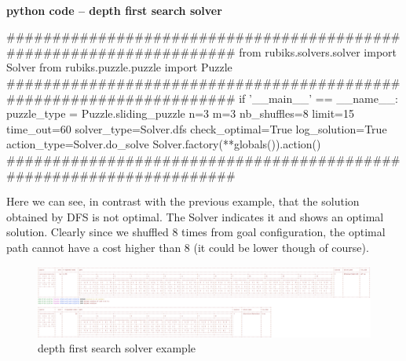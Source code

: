 \paragraph{}{\textbf{python code -- depth first search solver}}
\begin{python}
####################################################################
from rubiks.solvers.solver import Solver
from rubiks.puzzle.puzzle import Puzzle
####################################################################
if '__main__' == __name__:
    puzzle_type = Puzzle.sliding_puzzle
    n=3
    m=3
    nb_shuffles=8
    limit=15
    time_out=60
    solver_type=Solver.dfs
    check_optimal=True
    log_solution=True
    action_type=Solver.do_solve
    Solver.factory(**globals()).action()
####################################################################

\end{python}
\black
Here we can see, in contrast with the previous example, that the solution obtained by DFS is not optimal. The Solver indicates it and shows an optimal solution. Clearly since we shuffled 8 times from goal configuration, the optimal path cannot have a cost higher than 8 (it could be lower though of course).

\begin{figure}[H]
\centering
\includegraphics[scale=0.2]{./Figures/exampledfssolver}
\caption[Examples]{depth first search solver example}
\label{fig:exampledfssolver}
\end{figure}


